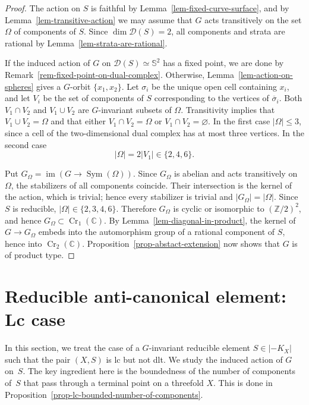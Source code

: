\documentclass[11pt]{amsart}
\numberwithin{equation}{section}
\theoremstyle{definition}
\theoremstyle{remark}
\DeclareMathOperator{\Cr}{Cr}
\begin{document}
\begin{proof}
{
The action on $S$ is faithful by Lemma~\ref{lem-fixed-curve-surface},
and by Lemma~\ref{lem-transitive-action} we may assume that $G$ acts
transitively on the set $\Omega$ of components of $S$. Since
$\dim\mathcal D(S)=2$, all components and strata are rational by
Lemma~\ref{lem-strata-are-rational}.

If the induced action of $G$ on
$\mathcal D(S)\simeq\mathbb S^2$ has a fixed point, we are done
by Remark~\ref{rem-fixed-point-on-dual-complex}. Otherwise,
Lemma~\ref{lem-action-on-spheres} gives a $G$-orbit $\{x_1,x_2\}$.
Let $\sigma_i$ be the unique open cell containing $x_i$, and let $V_i$
be the set of components of $S$ corresponding to the vertices of
$\overline\sigma_i$. Both
$V_1\cap V_2$ and $V_1\cup V_2$ are $G$-invariant subsets of $\Omega$.
Transitivity implies that $V_1\cup V_2=\Omega$ and that either
$V_1\cap V_2=\Omega$ or $V_1\cap V_2=\varnothing$. In the first case
$|\Omega|\leq3$, since a cell of the two-dimensional dual complex has
at most three vertices. In the second case
\[
|\Omega|=2|V_1|\in\{2,4,6\}.
\]

Put $G_\Omega=\operatorname{im}(G\to\operatorname{Sym}(\Omega))$.
Since $G_\Omega$ is abelian and acts transitively on $\Omega$, the stabilizers of all
components coincide. Their intersection is the kernel of the action,
which is trivial; hence every stabilizer is trivial and
$|G_\Omega|=|\Omega|$. Since $S$ is reducible, $|\Omega|\in\{2,3,4,6\}$.
Therefore $G_\Omega$ is cyclic or isomorphic to $(\mathbb Z/2)^2$, and hence
$G_\Omega\subset\Cr_1(\mathbb C)$. By Lemma~\ref{lem-diagonal-in-product},
the kernel of $G\to G_\Omega$ embeds into the automorphism group of a rational
component of $S$, hence into $\Cr_2(\mathbb C)$. Proposition~\ref{prop-abstact-extension}
now shows that $G$ is of product type.
}
\end{proof}

\section{Reducible anti-canonical element: Lc case}
\label{sec-reducible-lc}
In this section, we treat the case of a $G$-invariant reducible element $S\in |-K_X|$ such that the pair $(X, S)$ is lc but not dlt. We study the induced action of $G$ on~$S$. The key ingredient here is the boundedness of the number of components of~$S$ that pass through a terminal point on a threefold $X$. This is done in Proposition~\ref{prop-lc-bounded-number-of-components}. 
\end{document}
